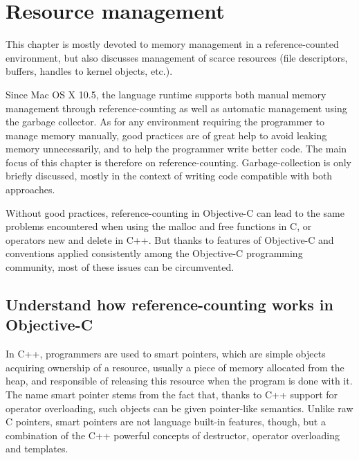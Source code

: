 \chapter{Resource management}
This chapter is mostly devoted to memory management in a reference-counted environment, but also discusses management of scarce resources (file descriptors, buffers, handles to kernel objects, etc.).

Since Mac OS X 10.5, the language runtime supports both manual memory management through reference-counting as well as automatic management using the garbage collector. As for any environment requiring the programmer to manage memory manually, good practices are of great help to avoid leaking memory unnecessarily, and to help the programmer write better code. The main focus of this chapter is therefore on reference-counting. Garbage-collection is only briefly discussed, mostly in the context of writing code compatible with both approaches.

Without good practices, reference-counting in Objective-C can lead to the same problems encountered when using the malloc and free functions in C, or operators new and delete in C++. But thanks to features of Objective-C and conventions applied consistently among the Objective-C programming community, most of these issues can be circumvented.

\section{Understand how reference-counting works in Objective-C}\label{sec:refCountingBasics}
In C++, programmers are used to smart pointers, which are simple objects acquiring ownership of a resource, usually a piece of memory allocated from the heap, and responsible of releasing this resource when the program is done with it. The name smart pointer stems from the fact that, thanks to C++ support for operator overloading, such objects can be given pointer-like semantics. Unlike raw C pointers, smart pointers are not language built-in features, though, but a combination of the C++ powerful concepts of destructor, operator overloading and templates.

